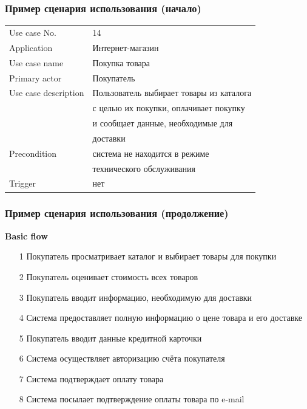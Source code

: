 \documentclass{softengineering-lectures}
\begin{document}
\begin{frame}
  \frametitle{Пример сценария использования (начало)}

  \begin{tabular}{|l|l|}
    \hline
    Use case No. & 14 \\
    Application & Интернет-магазин \\
    Use case name & Покупка товара \\
    Primary actor & Покупатель \\
    Use case description & Пользователь выбирает товары из каталога \\
    & с целью их покупки, оплачивает покупку \\
    & и сообщает данные, необходимые для \\
    & доставки\\
    Precondition & система не находится в режиме\\
    & технического обслуживания \\
    Trigger & нет\\
    \hline
  \end{tabular}
\end{frame}

\begin{frame}
  \frametitle{Пример сценария использования (продолжение)}

  \textbf{Basic flow}
  \begin{enumerate}
  \item[1] Покупатель просматривает каталог и выбирает товары для покупки
  \item[2] Покупатель оценивает стоимость всех товаров
  \item[3] Покупатель вводит информацию, необходимую для доставки
  \item[4] Система предоставляет полную информацию о цене товара и его доставке
  \item[5] Покупатель вводит данные кредитной карточки
  \item[6] Система осуществляет авторизацию счёта покупателя
  \item[7] Система подтверждает оплату товара
  \item[8] Система посылает подтверждение оплаты товара по e-mail
  \end{enumerate}
\end{frame}
\end{document}
